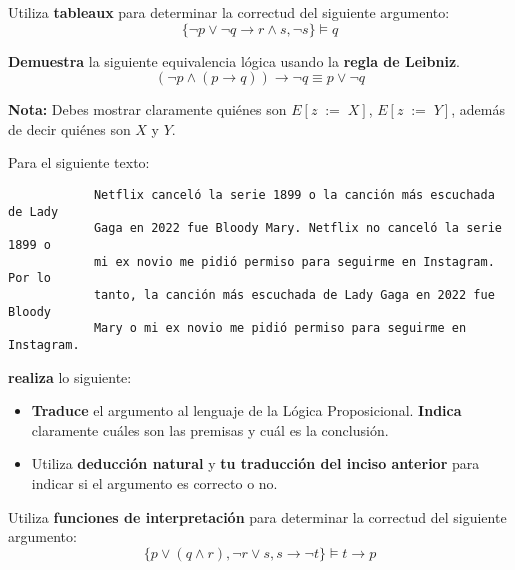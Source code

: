 \documentclass[oneside]{style}
\begin{document}
\begin{questions}[label=\protect\circled{\bfseries\arabic*}]

    \question
    {
        Utiliza \textbf{tableaux} para determinar la correctud del siguiente 
        argumento:
        \begin{equation*}
            \{\neg p \lor \neg q \rightarrow r \land s, \neg s\} 
            \models q
        \end{equation*}
    } 

    \question
    {
        \textbf{Demuestra} la siguiente equivalencia lógica usando la 
        \textbf{regla de Leibniz}.
        \begin{equation*}
            (\neg p \land (p \rightarrow q)) \rightarrow \neg q 
            \equiv p \lor \neg q
        \end{equation*}

        \textbf{Nota:} Debes mostrar claramente quiénes son $E[z \; := \; X]$, 
        $E[z \; := \; Y]$, además de decir quiénes son $X$ y $Y$. 
    }

    \question
    {
        Para el siguiente texto:
        \begin{verbatim}
            Netflix canceló la serie 1899 o la canción más escuchada de Lady 
            Gaga en 2022 fue Bloody Mary. Netflix no canceló la serie 1899 o 
            mi ex novio me pidió permiso para seguirme en Instagram. Por lo 
            tanto, la canción más escuchada de Lady Gaga en 2022 fue Bloody
            Mary o mi ex novio me pidió permiso para seguirme en Instagram. 
        \end{verbatim}

        \textbf{realiza} lo siguiente:
        \begin{itemize}
            \item \textbf{Traduce} el argumento al lenguaje de la Lógica 
            Proposicional. \textbf{Indica} claramente cuáles son las premisas 
            y cuál es la conclusión. 
            
            \item Utiliza \textbf{deducción natural} y \textbf{tu 
            traducción del inciso anterior} para indicar si el argumento es 
            correcto o no. 
        \end{itemize}
    }   

    \question
    {
        Utiliza \textbf{funciones de interpretación} para determinar la 
        correctud del siguiente argumento:
        \begin{equation*}
            \{p \lor (q \land r), \neg r \lor s, s \rightarrow \neg t\} \models 
            t \rightarrow p
        \end{equation*}
    } 
\end{questions}
\end{document}
